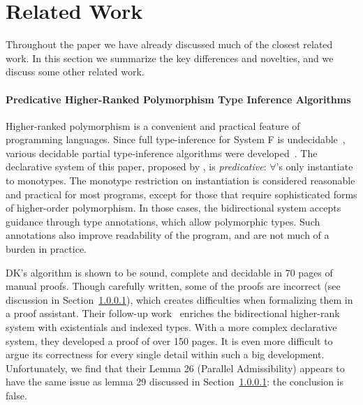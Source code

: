 \section{Related Work}

Throughout the paper we have already discussed much of the closest related work.
In this section we summarize the key differences and novelties, and we discuss some other
related work.


\paragraph{Predicative Higher-Ranked Polymorphism Type Inference Algorithms}
Higher-ranked polymorphism is a convenient and practical feature of
programming languages.  Since full type-inference for System F is
undecidable~\cite{wells1999typability}, various decidable partial
type-inference algorithms were developed~\cite{}.  The declarative system of
this paper, proposed by \citet{dunfield2013complete}, is \emph{predicative}: 
$\forall$'s only instantiate to monotypes.  The monotype restriction
on instantiation is considered reasonable and practical for most
programs, except for those that require sophisticated forms of
higher-order polymorphism.  In those cases, the bidirectional system
accepts guidance through type annotations, which allow polymorphic types.
Such annotations also improve
readability of the program, and are not much of a burden in practice.

DK's algorithm is shown to be sound, complete and decidable in 70 pages of manual proofs.
Though carefully written, some of the proofs are incorrect (see discussion in Section~\ref{}),
which creates difficulties when formalizing them in a proof assistant.
Their follow-up work~\cite{} enriches the bidirectional higher-rank system with
existentials and indexed types.
With a more complex declarative system, they developed a proof of over 150 pages.
It is even more difficult to argue its correctness for every single detail within such a big development.
Unfortunately, we find that their Lemma 26 (Parallel Admissibility) appears to have the same issue 
as lemma 29 discussed in Section~\ref{}: the conclusion is false.


